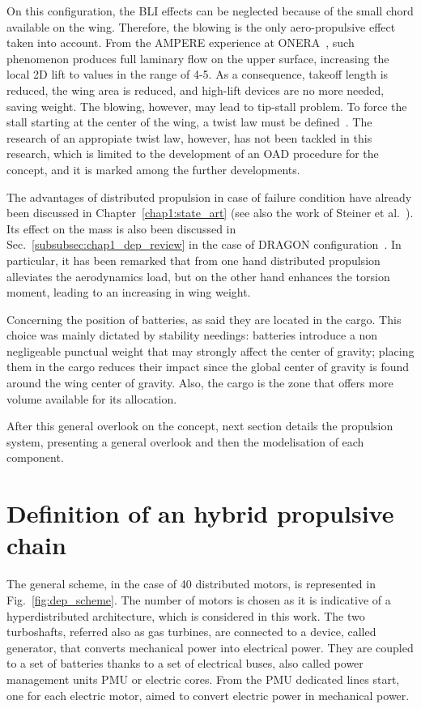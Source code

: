 On this configuration, the BLI effects can be neglected because of the small chord available on the wing. 
Therefore, the blowing is the only aero-propulsive effect taken into account. 
From the AMPERE experience at ONERA~\cite{bib:ampere_ref}, such phenomenon produces full laminary flow on the upper surface, increasing the local 2D lift to values in the range of 4-5. 
As a consequence, takeoff length is reduced, the wing area is reduced, and high-lift devices are no more needed, saving weight. 
The blowing, however, may lead to tip-stall problem.
To force the stall starting at the center of the wing, a twist law must be defined~\cite{bib:cdn_notes}. 
The research of an appropiate twist law, however, has not been tackled in this research, which is limited to the development of an OAD procedure for the concept, and it is marked among the further developments. 

The advantages of distributed propulsion in case of failure condition have already been discussed in Chapter~\ref{chap1:state_art} (see also the work of Steiner et al.~\cite{bib:steiner}). 
Its effect on the mass is also been discussed in Sec.~\ref{subsubsec:chap1_dep_review} in the case of DRAGON configuration~\cite{bib:dragon}. 
In particular, it has been remarked that from one hand distributed propulsion alleviates the aerodynamics load, but on the other hand enhances the torsion moment, leading to an increasing in wing weight. 

Concerning the position of batteries, as said they are located in the cargo.
This choice was mainly dictated by stability needings: batteries introduce a non negligeable punctual weight that may strongly affect the center of gravity; placing them in the cargo reduces their impact since the global center of gravity is found around the wing center of gravity. 
Also, the cargo is the zone that offers more volume available for its allocation. 

After this general overlook on the concept, next section details the propulsion system, presenting a general overlook and then the modelisation of each component. 

\section{Definition of an hybrid propulsive chain}
\label{sec:chap3_prop_chain_desc}

The general scheme, in the case of 40 distributed motors, is represented in Fig.~\ref{fig:dep_scheme}.
The number of motors is chosen as it is indicative of a hyperdistributed architecture, which is considered in this work. 
The two turboshafts, referred also as gas turbines, are connected to a device, called generator, that converts mechanical power into electrical power. 
They are coupled to a set of batteries thanks to a set of electrical buses, also called power management units PMU or electric cores. 
From the PMU dedicated lines start, one for each electric motor, aimed to convert electric power in mechanical power. 


